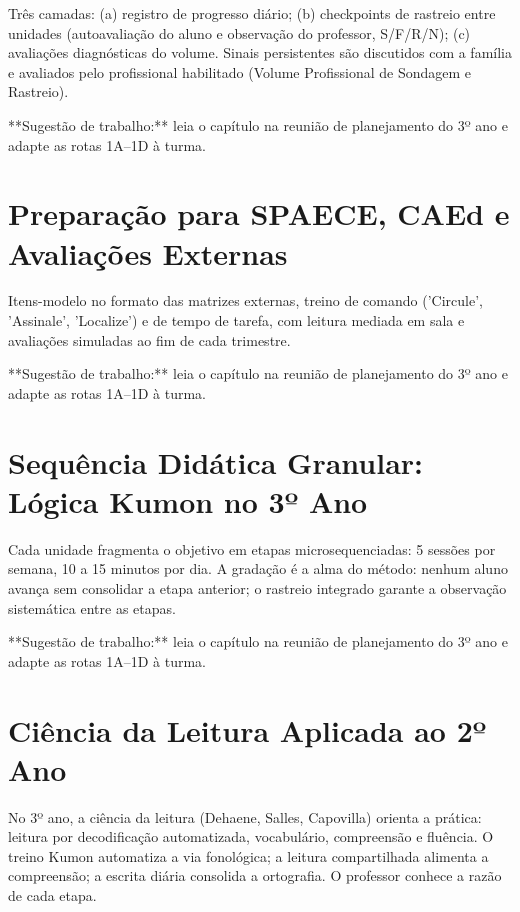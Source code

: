 Três camadas: (a) registro de progresso diário; (b) checkpoints de rastreio entre unidades (autoavaliação do aluno e observação do professor, S/F/R/N); (c) avaliações diagnósticas do volume. Sinais persistentes são discutidos com a família e avaliados pelo profissional habilitado (Volume Profissional de Sondagem e Rastreio).


\begin{dica}
**Sugestão de trabalho:** leia o capítulo na reunião de planejamento do 3º ano e adapte as rotas 1A–1D à turma.
\end{dica}

\chapter{Preparação para SPAECE, CAEd e Avaliações Externas}

Itens-modelo no formato das matrizes externas, treino de comando ('Circule', 'Assinale', 'Localize') e de tempo de tarefa, com leitura mediada em sala e avaliações simuladas ao fim de cada trimestre.


\begin{dica}
**Sugestão de trabalho:** leia o capítulo na reunião de planejamento do 3º ano e adapte as rotas 1A–1D à turma.
\end{dica}

\chapter{Sequência Didática Granular: Lógica Kumon no 3º Ano}

Cada unidade fragmenta o objetivo em etapas microsequenciadas: 5 sessões por semana, 10 a 15 minutos por dia. A gradação é a alma do método: nenhum aluno avança sem consolidar a etapa anterior; o rastreio integrado garante a observação sistemática entre as etapas.


\begin{dica}
**Sugestão de trabalho:** leia o capítulo na reunião de planejamento do 3º ano e adapte as rotas 1A–1D à turma.
\end{dica}

\chapter{Ciência da Leitura Aplicada ao 2º Ano}

No 3º ano, a ciência da leitura (Dehaene, Salles, Capovilla) orienta a prática: leitura por decodificação automatizada, vocabulário, compreensão e fluência. O treino Kumon automatiza a via fonológica; a leitura compartilhada alimenta a compreensão; a escrita diária consolida a ortografia. O professor conhece a razão de cada etapa.


